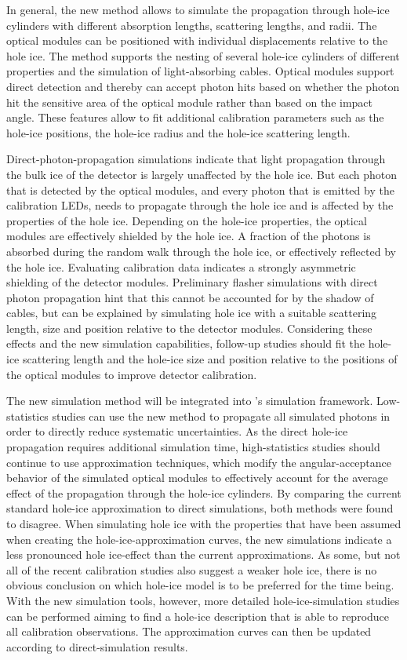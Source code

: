 In general, the new method allows to simulate the propagation through hole-ice cylinders with different absorption lengths, scattering lengths, and radii.
The optical modules can be positioned with individual displacements relative to the hole ice.
The method supports the nesting of several hole-ice cylinders of different properties and the simulation of light-absorbing cables.
Optical modules support direct detection and thereby can accept photon hits based on whether the photon hit the sensitive area of the optical module rather than based on the impact angle.
These features allow to fit additional calibration parameters such as the hole-ice positions, the hole-ice radius and the hole-ice scattering length.

Direct-photon-propagation simulations indicate that light propagation through the bulk ice of the \icecube detector is largely unaffected by the hole ice. But each photon that is detected by the optical modules, and every photon that is emitted by the calibration LEDs, needs to propagate through the hole ice and is affected by the properties of the hole ice.
Depending on the hole-ice properties, the optical modules are effectively shielded by the hole ice. A fraction of the photons is absorbed during the random walk through the hole ice, or effectively reflected by the hole ice.
Evaluating calibration data indicates a strongly asymmetric shielding of the detector modules. Preliminary flasher simulations with direct photon propagation hint that this cannot be accounted for by the shadow of cables, but can be explained by simulating hole ice with a suitable scattering length, size and position relative to the detector modules.
Considering these effects and the new simulation capabilities, follow-up studies should fit the hole-ice scattering length and the hole-ice size and position relative to the positions of the optical modules to improve detector calibration.

The new simulation method will be integrated into \icecube's simulation framework.
Low-statistics studies can use the new method to propagate all simulated photons in order to directly reduce systematic uncertainties.
As the direct hole-ice propagation requires additional simulation time, high-statistics studies should continue to use approximation techniques, which modify the angular-acceptance behavior of the simulated optical modules to effectively account for the average effect of the propagation through the hole-ice cylinders.
By comparing the current standard hole-ice approximation to direct simulations, both methods were found to disagree.
When simulating hole ice with the properties that have been assumed when creating the hole-ice-approximation curves, the new simulations indicate a less pronounced hole ice-effect than the current approximations.
As some, but not all of the recent calibration studies also suggest a weaker hole ice, there is no obvious conclusion on which hole-ice model is to be preferred for the time being.
With the new simulation tools, however, more detailed hole-ice-simulation studies can be performed aiming to find a hole-ice description that is able to reproduce all calibration observations.
The approximation curves can then be updated according to direct-simulation results.

